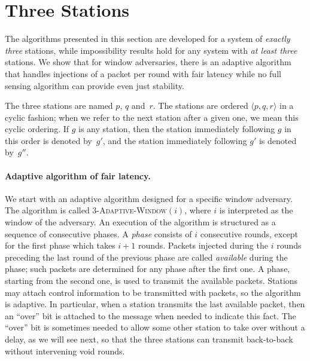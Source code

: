 \documentclass[11pt]{article}
\newcommand{\BBB}{\vspace*{-\bigskipamount}}
\newcommand{\Paragraph}[1]{\BBB\paragraph{#1}}
\begin{document}
\section{Three Stations}

\label{sec:three}



The algorithms presented in this section are developed for a system of \emph{exactly three} stations, while impossibility results hold for any system with \emph{at least three} stations.
We show that for window adversaries, there is an adaptive algorithm that handles injections of a packet per round with fair latency while no full sensing algorithm can provide even just stability.

The three stations are named $p$, $q$ and~$r$.
The stations are ordered $\langle p, q, r\rangle$ in a cyclic fashion; when we refer to the next station after a given one, we mean this cyclic ordering.
If $g$ is any station, then the station immediately following $g$ in this order is denoted by~$g'$,  and the station immediately following $g'$ is denoted by~$g''$.





\Paragraph{Adaptive  algorithm of fair latency.}




We start with an adaptive algorithm designed for a specific window adversary.
The algorithm is called \textsc{3-Adaptive-Window$(i)$}, where $i$ is interpreted as the window of the adversary.
An execution of the algorithm is structured as a sequence of consecutive phases.
A \emph{phase} consists of $i$ consecutive rounds, except for the first phase which takes $i+1$ rounds.
Packets injected during the $i$ rounds preceding the last round of the previous phase are called \emph{available} during the phase; such packets are determined for any phase after the first one.
A phase, starting from the second one, is used to transmit the available packets.
Stations may attach control information to be transmitted with packets, so the algorithm is adaptive.
In particular, when a station transmits the last available packet, then an ``over'' bit is attached to the message when needed to indicate this fact.
The ``over'' bit is sometimes needed to allow some other station to take over without a delay, as we will see next, so that the three stations can transmit back-to-back without intervening void rounds.
\end{document}
